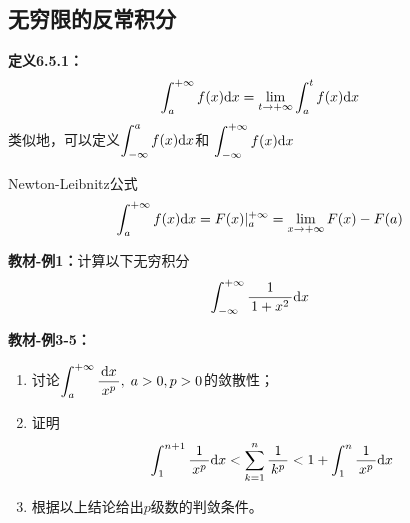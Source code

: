 \subsection{无穷限的反常积分}

{\bf 定义6.5.1：}
$${\displaystyle\int_a^{+\infty}f(x)\mathrm{d} x}
=\lim\limits_{t\to+\infty}\displaystyle\int_a^tf(x)\mathrm{d} x$$
类似地，可以定义${\displaystyle\int_{-\infty}^af(x)\mathrm{d} x}$和
${\displaystyle\int_{-\infty}^{+\infty}f(x)\mathrm{d} x}$

Newton-Leibnitz公式 
  $$\displaystyle\int_a^{+\infty}f(x)\mathrm{d} x=F(x)|_{a}^{+\infty}
  =\lim\limits_{x\to{+\infty}}F(x)-F(a)$$
  
{\bf 教材-例1：}计算以下无穷积分
$$\displaystyle\int_{-\infty}^{+\infty}\displaystyle\frac{\,{1}\,}{\,{1+x^2}\,}\mathrm{d} x$$

\begin{center}
\end{center}

{\bf 教材-例3-5：}
\begin{enumerate}[(1)]
  \setlength{\itemindent}{1cm}
  \item 讨论$\displaystyle\int_a^{+\infty}\displaystyle\frac{\,{\mathrm{d} x}\,}{\,{x^p}\,},\;a>0, p>0$的敛散性； 
  \item 证明$$\displaystyle\int_1^{n+1}\displaystyle\frac{\,{1}\,}{\,{x^p}\,}\mathrm{d} x<\sum\limits_{k=1}^n\displaystyle\frac{\,{1}\,}{\,{k^p}\,}
  <1+\displaystyle\int_1^n\displaystyle\frac{\,{1}\,}{\,{x^p}\,}\mathrm{d} x$$ 
  \item 根据以上结论给出$p$级数的判敛条件。
\end{enumerate}

